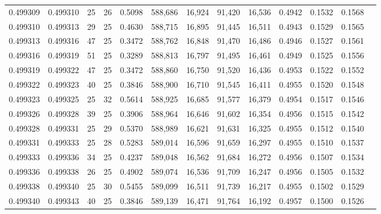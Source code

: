 \begin{tabular}{rrrrrrrrrrrrr}
0.499309 & 0.499310 &    25 &  26 &                                     0.5098 & 588,686 &  16,924 &  91,420 &  16,536 & 0.4942 & 0.1532 & 0.1568 \\
0.499310 & 0.499313 &    29 &  25 &                                     0.4630 & 588,715 &  16,895 &  91,445 &  16,511 & 0.4943 & 0.1529 & 0.1565 \\
0.499313 & 0.499316 &    47 &  25 &                                     0.3472 & 588,762 &  16,848 &  91,470 &  16,486 & 0.4946 & 0.1527 & 0.1561 \\
0.499316 & 0.499319 &    51 &  25 &                                     0.3289 & 588,813 &  16,797 &  91,495 &  16,461 & 0.4949 & 0.1525 & 0.1556 \\
0.499319 & 0.499322 &    47 &  25 &                                     0.3472 & 588,860 &  16,750 &  91,520 &  16,436 & 0.4953 & 0.1522 & 0.1552 \\
0.499322 & 0.499323 &    40 &  25 &                                     0.3846 & 588,900 &  16,710 &  91,545 &  16,411 & 0.4955 & 0.1520 & 0.1548 \\
0.499323 & 0.499325 &    25 &  32 &                                     0.5614 & 588,925 &  16,685 &  91,577 &  16,379 & 0.4954 & 0.1517 & 0.1546 \\
0.499326 & 0.499328 &    39 &  25 &                                     0.3906 & 588,964 &  16,646 &  91,602 &  16,354 & 0.4956 & 0.1515 & 0.1542 \\
0.499328 & 0.499331 &    25 &  29 &                                     0.5370 & 588,989 &  16,621 &  91,631 &  16,325 & 0.4955 & 0.1512 & 0.1540 \\
0.499331 & 0.499333 &    25 &  28 &                                     0.5283 & 589,014 &  16,596 &  91,659 &  16,297 & 0.4955 & 0.1510 & 0.1537 \\
0.499333 & 0.499336 &    34 &  25 &                                     0.4237 & 589,048 &  16,562 &  91,684 &  16,272 & 0.4956 & 0.1507 & 0.1534 \\
0.499336 & 0.499338 &    26 &  25 &                                     0.4902 & 589,074 &  16,536 &  91,709 &  16,247 & 0.4956 & 0.1505 & 0.1532 \\
0.499338 & 0.499340 &    25 &  30 &                                     0.5455 & 589,099 &  16,511 &  91,739 &  16,217 & 0.4955 & 0.1502 & 0.1529 \\
0.499340 & 0.499343 &    40 &  25 &                                     0.3846 & 589,139 &  16,471 &  91,764 &  16,192 & 0.4957 & 0.1500 & 0.1526 \\

\end{tabular}
